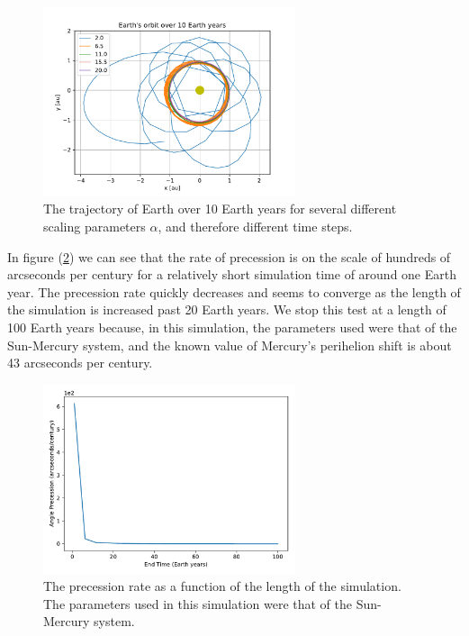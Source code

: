 \documentclass{report}
\begin{document}
            \begin{figure}[h]
                \centering
                \includegraphics[width = 0.66\textwidth]{images/Earth_Trajectory_10.pdf}
                \caption{The trajectory of Earth over 10 Earth years for several different scaling parameters $\alpha$, and therefore different time steps.}
                \label{fig:Earth_trajectory}
            \end{figure}
            
            In figure (\ref{fig:rate_vs_length}) we can see that the rate of precession is on the scale of hundreds of arcseconds per century for a relatively short simulation time of around one Earth year.  The precession rate quickly decreases and seems to converge as the length of the simulation is increased past 20 Earth years.  We stop this test at a length of 100 Earth years because, in this simulation, the parameters used were that of the Sun-Mercury system, and the known value of Mercury's perihelion shift is about 43 arcseconds per century.
            
            \begin{figure}[t!]
                \centering
                \includegraphics[width = 0.66\textwidth]{images/Precession_rate_Runtime_Comparison.pdf}
                \caption{The precession rate as a function of the length of the simulation.  The parameters used in this simulation were that of the Sun-Mercury system.}
                \label{fig:rate_vs_length}
            \end{figure}
            
\end{document}

